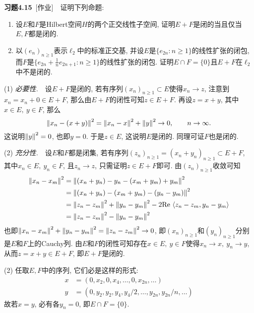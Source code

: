     \textbf{习题4.15}\ [作业]\ \ 证明下列命题:
    \begin{enumerate}[(1)]
    \item 设$ E $和$ F $是Hilbert空间$ H $的两个正交线性子空间, 证明$ E+F $是闭的当且仅当$ E, F $都是闭的.
    \item 以$ (e_n)_{n\geqslant 1} $表示$ \ell_2 $中的标准正交基, 并设$ E $是$ \{ e_{2n} : n\geqslant 1 \} $的线性扩张的闭包, 而$ F $是$ \{ e_{2n}+\frac{1}{n}e_{2n+1} : n\geqslant 1 \} $的线性扩张的闭包. 证明$ E\cap F=\{0\} $且$ E+F $在$ \ell_2 $中不是闭的.
    \end{enumerate}
    \begin{Proof}
    (1) \textsl{必要性.}\ \ 设$ E+F $是闭的, 若有序列$ (x_n)_{n\geqslant 1}\subset E $使得$ x_n\to z $, 注意到$ x_n=x_n+0\in E+F $, 那么由$ E+F $的闭性可知$ z\in E+F $. 再设$ z=x+y $, 其中$ x\in E,\ y\in F $, 那么
    \[
    \left\| x_{n}-(x+y) \right\|^2=\left\| x_{n}-x \right\|^2+\left\| y \right\|^2\to 0,\qquad n\to\infty.
    \]
    这说明$ \left\| y \right\|^2=0 $, 也即$ y=0 $. 于是$ z\in E $, 这说明$ E $是闭的. 同理可证$ F $也是闭的.
    
    (2) \textsl{充分性.}\ \ 设$ E $和$ F $都是闭集, 若有序列$ (z_n)_{n\geqslant 1}=(x_{n}+y_{n})_{n\geqslant1}\subset E+F $, 其中$ x_n\in E,\ y_n\in F $, 且$ z_n\to z $, 只需证明$ z\in E+F $即可. 由$ (z_n)_{n\geqslant 1} $收敛可知
    \[
    \begin{aligned}
    \left\| x_n-x_m \right\|^2&=\left\| (x_n+y_n)-y_n-(x_m+y_m)+y_m \right\|^2\\
    &=\left\| (x_n+y_n)-(x_m+y_m)-(y_n-y_m) \right\|^2\\
    &=\left\| z_n-z_m \right\|^2+\left\| y_n-y_m \right\|^2-2\mathrm{Re\,}\left\langle z_n-z_m,y_n-y_m \right\rangle\\
    &=\left\| z_n-z_m \right\|^2-\left\| y_n-y_m \right\|^2
    \end{aligned}
    \]
    也即$ \left\| x_n-x_m \right\|^2+\left\| y_n-y_m \right\|^2=\left\| z_n-z_m \right\|^2\to 0 $, 即$ (x_n)_{n\geqslant 1} $和$ (y_n)_{n\geqslant 1} $分别是$ E $和$ F $上的Cauchy列. 由$ E $和$ F $的闭性可知存在$ x\in E,\ y\in F $使得$ x_n\to x,\ y_n\to y $, 从而$ z=x+y\in E+F $, 即$ E+F $是闭的.
    
    (2) 任取$ E, F $中的序列, 它们必是这样的形式:
    \[
    \begin{aligned}
    x & = (0,x_2,0,x_4,\dots,0,x_{2n},\dots)\\
    y & = (0,y_2,y_2,y_4,y_4/2,\dots,y_{2n},y_{2n}/n,\dots)
    \end{aligned}
    \]
    故若$ x=y $, 必有各$ y_n=0 $, 即$ E\cap F=\{0\} $.
    

\end{Proof}
